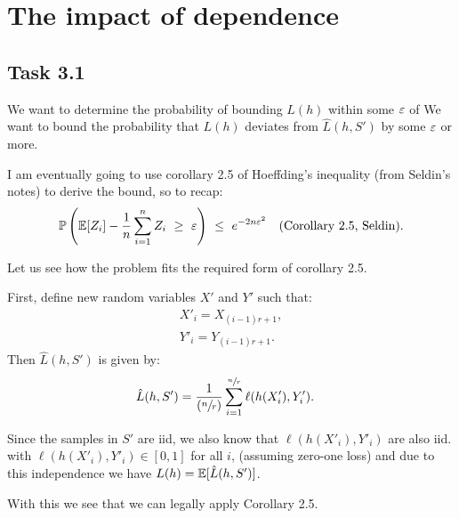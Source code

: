 \newpage
\section{The impact of dependence}

\subsection{Task 3.1}

We want to determine the probability of bounding $L(h)$ within some $\varepsilon$ of
We want to bound the probability that $L(h)$ deviates from $\hat L(h, S')$ by
some $\varepsilon$ or more.

I am eventually going to use corollary 2.5 of Hoeffding's inequality (from
Seldin's notes) to derive the bound, so to recap:
\begin{align*}
  \P\left(\E[Z_i] -\frac{1}{n} \sum_{i = 1}^n Z_i  \  \geq\   \eps\right)\
  \leq\ 
  e^{-2n\eps^2} \quad (\text{Corollary 2.5, Seldin}).
\end{align*}

Let us see how the problem fits the required form of corollary 2.5.

First, define new random variables $X'$ and $Y'$ such that:
\begin{align*}
  X'_i = X_{(i - 1)r + 1},\\
  Y'_i = Y_{(i - 1)r + 1}.
\end{align*}
Then $\hat L(h, S')$ is given by:
\begin{align*}
  \hat L(h, S') &= \frac{1}{(\sfrac{n}{r})}\sum_{i = 1}^{\sfrac{n}{r}} \ell(h(X'_i), Y'_i).
\end{align*}

Since the samples in $S'$ are iid, we also know that $\ell(h(X'_i), Y'_i)$ are
also iid. with $\ell(h(X'_i), Y'_i) \in [0, 1]$ for all $i$, (assuming zero-one
loss) and due to this independence we have $L(h) = \mathbb E[\hat{L}(h, S')]$.

With this we see that we can legally apply Corollary 2.5.

